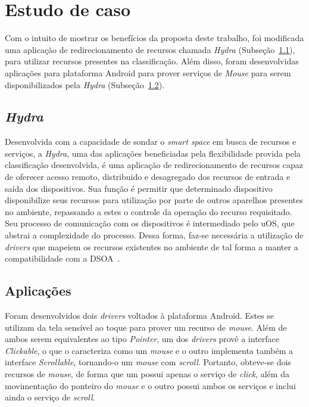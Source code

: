 \section{Estudo de caso}
\label{sec:estudoDeCaso}

Com o intuito de mostrar os benefícios da proposta deste trabalho, foi modificada uma aplicação de redirecionamento de recursos chamada \emph{Hydra} (Subseção~\ref{subsec:Hydra}), para utilizar recursos presentes na classificação. Além disso, foram desenvolvidas aplicações para plataforma Android para prover serviços de \emph{Mouse} para serem disponibilizados pela \emph{Hydra} (Subseção~\ref{subsec:aplicacoes}).

\subsection{\emph{Hydra}}
\label{subsec:Hydra}

Desenvolvida com a capacidade de sondar o \emph{smart space} em busca de recursos e serviços, a \emph{Hydra}, uma das aplicações beneficiadas pela flexibilidade provida pela classificação desenvolvida, é uma aplicação de redirecionamento de recursos capaz de oferecer acesso remoto, distribuido e desagregado dos recursos de entrada e saída dos dispositivos. Sua função é permitir que determinado dispositivo disponibilize seus recursos para utilização por parte de outros aparelhos presentes no ambiente, repassando a estes o controle da operação do recurso requisitado. Seu processo de comunicação com os dispositivos é intermediado pelo uOS, que abstrai a complexidade do processo. Dessa forma, faz-se necessária a utilização de \emph{drivers} que mapeiem os recursos existentes no ambiente de tal forma a manter a compatibilidade com a DSOA~\cite{lucas2011}.

\subsection{Aplicações}
\label{subsec:aplicacoes}

Foram desenvolvidos dois \emph{drivers} voltados à plataforma Android. Estes se utilizam da tela sensível ao toque para prover um recurso de \emph{mouse}. Além de ambos serem equivalentes ao tipo \emph{Pointer}, um dos \emph{drivers} provê a interface \emph{Clickable}, o que o caracteriza como um \emph{mouse} e o outro implementa também a interface \emph{Scrollable}, tornando-o um \emph{mouse} com \emph{scroll}. Portanto, obteve-se dois recursos de \emph{mouse}, de forma que um possui apenas o serviço de \emph{click}, além da movimentação do ponteiro do \emph{mouse} e o outro possui ambos os serviços e inclui ainda o serviço de \emph{scroll}.

